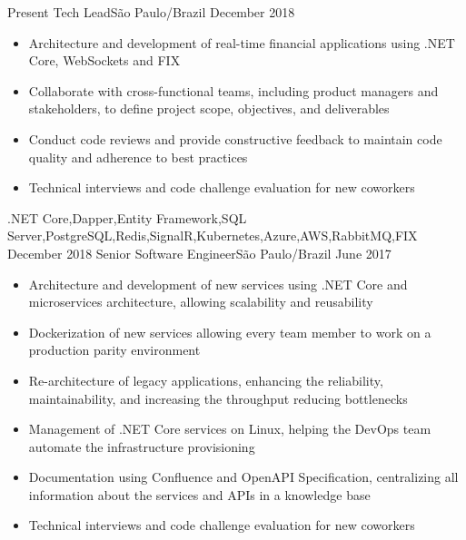 
\begin{experiences}  
  \experience
    {Present}   {Tech Lead}{}{São Paulo/Brazil}
    {December 2018} {
                  \begin{itemize}
                    \item Architecture and development of real-time financial applications using .NET Core, WebSockets and FIX
                    \item Collaborate with cross-functional teams, including product managers and stakeholders, to define project scope, objectives, and deliverables
                    \item Conduct code reviews and provide constructive feedback to maintain code quality and adherence to best practices
                    \item Technical interviews and code challenge evaluation for new coworkers
                  \end{itemize}
                }
                {.NET Core,Dapper,Entity Framework,SQL Server,PostgreSQL,Redis,SignalR,Kubernetes,Azure,AWS,RabbitMQ,FIX}
  \emptySeparator
  \experience
    {December 2018}   {Senior Software Engineer}{}{São Paulo/Brazil}
    {June 2017} {
                  \begin{itemize}
                    \item Architecture and development of new services using .NET Core and microservices architecture, allowing scalability and reusability 
                    \item Dockerization of new services allowing every team member to work on a production parity environment  
                    \item Re-architecture of legacy applications, enhancing the reliability, maintainability, and increasing the throughput reducing bottlenecks   
                    \item Management of .NET Core services on Linux, helping the DevOps team automate the infrastructure provisioning
                    \item Documentation using Confluence and OpenAPI Specification, centralizing all information about the services and APIs in a knowledge base 
                    \item Technical interviews and code challenge evaluation for new coworkers
                  \end{itemize}
}
\end{experiences}

